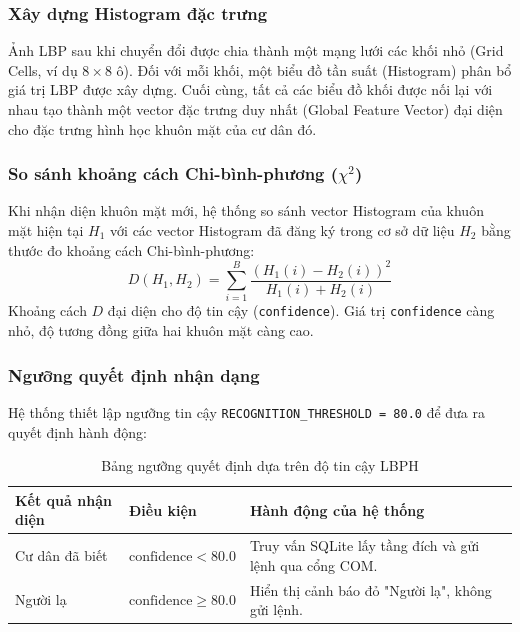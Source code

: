 \documentclass[12pt,a4paper]{article}
\begin{document}
\subsubsection{Xây dựng Histogram đặc trưng}
Ảnh LBP sau khi chuyển đổi được chia thành một mạng lưới các khối nhỏ (Grid Cells, ví dụ $8 \times 8$ ô). Đối với mỗi khối, một biểu đồ tần suất (Histogram) phân bổ giá trị LBP được xây dựng. Cuối cùng, tất cả các biểu đồ khối được nối lại với nhau tạo thành một vector đặc trưng duy nhất (Global Feature Vector) đại diện cho đặc trưng hình học khuôn mặt của cư dân đó.

\subsubsection{So sánh khoảng cách Chi-bình-phương ($\chi^2$)}
Khi nhận diện khuôn mặt mới, hệ thống so sánh vector Histogram của khuôn mặt hiện tại $H_1$ với các vector Histogram đã đăng ký trong cơ sở dữ liệu $H_2$ bằng thước đo khoảng cách Chi-bình-phương:
\begin{equation}
    D(H_1, H_2) = \sum_{i=1}^{B} \frac{(H_1(i) - H_2(i))^2}{H_1(i) + H_2(i)}
\end{equation}
Khoảng cách $D$ đại diện cho độ tin cậy (\texttt{confidence}). Giá trị \texttt{confidence} càng nhỏ, độ tương đồng giữa hai khuôn mặt càng cao.

\subsubsection{Ngưỡng quyết định nhận dạng}
Hệ thống thiết lập ngưỡng tin cậy \texttt{RECOGNITION\_THRESHOLD = 80.0} để đưa ra quyết định hành động:
\begin{table}[H]
    \centering
    \begin{tabular}{|l|l|l|}
        \hline
        \textbf{Kết quả nhận diện} & \textbf{Điều kiện} & \textbf{Hành động của hệ thống} \\ \hline
        Cư dân đã biết & $\text{confidence} < 80.0$ & Truy vấn SQLite lấy tầng đích và gửi lệnh qua cổng COM. \\ \hline
        Người lạ & $\text{confidence} \ge 80.0$ & Hiển thị cảnh báo đỏ "Người lạ", không gửi lệnh. \\ \hline
    \end{tabular}
    \caption{Bảng ngưỡng quyết định dựa trên độ tin cậy LBPH}
    \label{tab:thresholds}
\end{table}

\newpage
\end{document}
